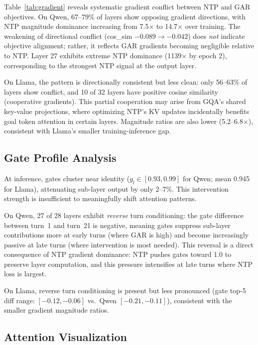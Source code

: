 \documentclass[11pt]{article}
\begin{document}
Table~\ref{tab:gradient} reveals systematic gradient conflict between NTP and GAR objectives.
On Qwen, 67--79\% of layers show opposing gradient directions, with NTP magnitude dominance increasing from 7.5$\times$ to 14.7$\times$ over training.
The weakening of directional conflict (cos\_sim $-0.089 \to -0.042$) does \emph{not} indicate objective alignment; rather, it reflects GAR gradients becoming negligible relative to NTP.
Layer 27 exhibits extreme NTP dominance (1139$\times$ by epoch 2), corresponding to the strongest NTP signal at the output layer.

On Llama, the pattern is directionally consistent but less clean: only 56--63\% of layers show conflict, and 10 of 32 layers have positive cosine similarity (cooperative gradients).
This partial cooperation may arise from GQA's shared key-value projections, where optimizing NTP's KV updates incidentally benefits goal token attention in certain layers.
Magnitude ratios are also lower (5.2--6.8$\times$), consistent with Llama's smaller training-inference gap.

\subsection{Gate Profile Analysis}

At inference, gates cluster near identity ($g_l \in [0.93, 0.99]$ for Qwen; mean 0.945 for Llama), attenuating sub-layer output by only 2--7\%.
This intervention strength is insufficient to meaningfully shift attention patterns.

On Qwen, 27 of 28 layers exhibit \emph{reverse} turn conditioning: the gate difference between turn~1 and turn~21 is negative, meaning gates suppress sub-layer contributions more at early turns (where GAR is high) and become increasingly passive at late turns (where intervention is most needed).
This reversal is a direct consequence of NTP gradient dominance: NTP pushes gates toward 1.0 to preserve layer computation, and this pressure intensifies at late turns where NTP loss is largest.

On Llama, reverse turn conditioning is present but less pronounced (gate top-5 diff range: $[-0.12, -0.06]$ vs.\ Qwen $[-0.21, -0.11]$), consistent with the smaller gradient magnitude ratios.

\subsection{Attention Visualization}
\end{document}
